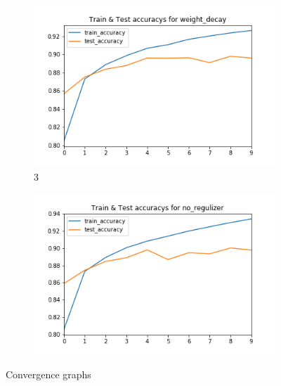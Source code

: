 \documentclass[10pt]{article}
\begin{document}
\begin{figure}[ht]
\begin{subfigure}[b]{0.475\textwidth}
            \includegraphics[width=\textwidth]{figures/weight_decay}
            \caption[]%
            {{\small 3}}    
            \label{fig:mean and std of net34}
        \end{subfigure}
        \quad
        \begin{subfigure}[b]{0.475\textwidth}   
            \centering 
            \includegraphics[width=\textwidth]{figures/no_regulizer}
            \caption[]%
            {{\small}}    
            \label{fig:mean and std of net44}
        \end{subfigure}
        \caption[ The average and standard deviation of critical parameter ]
        {\small Convergence graphs} 
        \label{fig:mean and std of nets}
    \end{figure}
\end{document}
